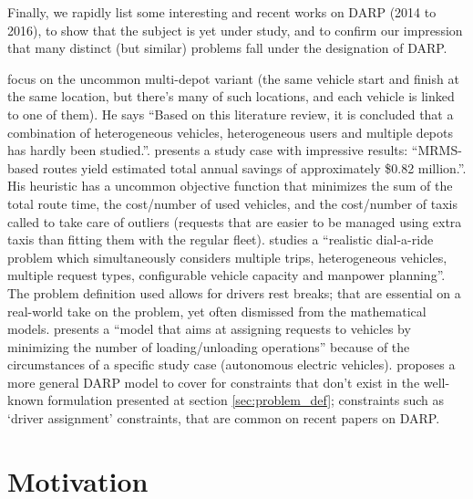 \documentclass[english,plano-doutorado,twoside]{iiufrgs}
\begin{document}
Finally, we rapidly list some interesting and recent works on DARP (2014 to 2016), to show that the subject is yet under study, and to confirm our impression that many distinct (but similar) problems fall under the designation of DARP.

\cite{braekers_exact_2014} focus on the uncommon multi-depot variant (the same vehicle start and finish at the same location, but there's many of such locations, and each vehicle is linked to one of them). He says ``Based on this literature review, it is concluded that a combination of heterogeneous vehicles, heterogeneous users and multiple depots has hardly been studied.''. \cite{markovic_optimizing_2015} presents a study case with impressive results: ``MRMS-based routes yield estimated total annual savings of approximately \$0.82 million.''. His heuristic has a uncommon objective function that minimizes the sum of the total route time, the cost/number of used vehicles, and the cost/number of taxis called to take care of outliers (requests that are easier to be managed using extra taxis than fitting them with the regular fleet). \cite{liu_branch_and_cut_2015} studies a ``realistic dial-a-ride problem which simultaneously considers multiple trips, heterogeneous vehicles, multiple request types, configurable vehicle capacity and manpower planning''. The problem definition used allows for drivers rest breaks; that are essential on a real-world take on the problem, yet often dismissed from the mathematical models. \cite{pimenta_models} presents a ``model that aims at assigning requests to vehicles by minimizing the number of loading/unloading operations'' because of the circumstances of a specific study case (autonomous electric vehicles). \cite{molenbruch_multi_directional_2016} proposes a more general DARP model to cover for constraints that don't exist in the well-known formulation presented at section \ref{sec:problem_def}; constraints such as `driver assignment' constraints, that are common on recent papers on DARP.

\section{Motivation}
\end{document}
